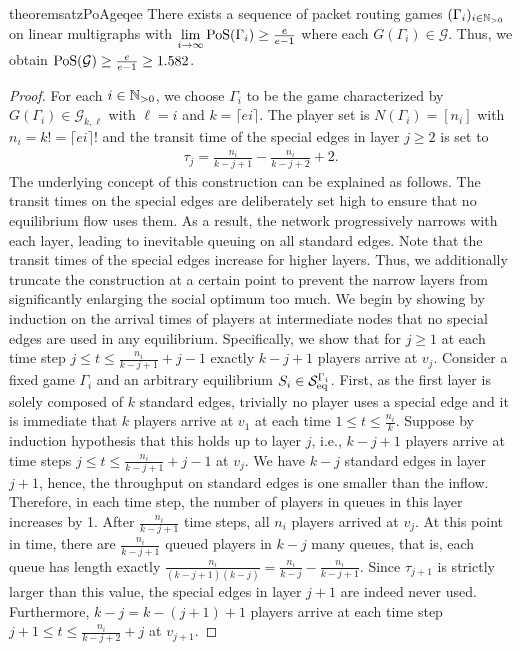 \begin{restatable}{theorem}{satzPoAgeqee}\label{satz_PoAgeqee1}
There exists a sequence of packet routing games $(\Gamma_i)_{i \in \mathbb{N}_{>0}}$ on linear multigraphs with
$\lim\limits_{i \rightarrow \infty} \operatorname*{PoS}(\Gamma_i) \geq \frac{e}{e-1}$ where each $G(\Gamma_i)\in \mathcal{G}$. Thus, we obtain $\operatorname*{PoS}(\mathcal{G})\geq \frac{e}{e-1}\geq 1.582$.
\end{restatable}
\begin{proof}
    For each $i\in \mathbb{N}_{>0}$, we choose $\Gamma_i$ to be the game characterized by $G(\Gamma_i)\in \mathcal{G}_{k,\ell}$ with $\ell = i$ and $k=\lceil ei\rceil$. The player set is $N(\Gamma_i)=[n_i]$ with $n_i= k!= \lceil ei\rceil!$ and the transit time of the special edges in layer $j\geq 2$ is set to
\begin{align*}
    \tau_j = \frac{n_i}{k-j+1} - \frac{n_i}{k-j+2} +2.
\end{align*}
The underlying concept of this construction can be explained as follows. The transit times on the special edges are deliberately set high to ensure that no equilibrium flow uses them. As a result, the network progressively narrows with each layer, leading to inevitable queuing on all standard edges. Note that the transit times of the special edges increase for higher layers. Thus, we additionally truncate the construction at a certain point to prevent the narrow layers from significantly enlarging the social optimum too much.
We begin by showing by induction on the arrival times of players at intermediate nodes that no special edges are used in any equilibrium. Specifically, we show that for $j\geq 1$ at each time step $j \leq t \leq \frac{n_i}{k-j+1}+j-1$ exactly $k-j+1$ players arrive at $v_j$. 
Consider a fixed game $\Gamma_i$ and an arbitrary equilibrium $S_i\in \mathcal{S}_{\operatorname{eq}}^{\Gamma_i}$.
First, as the first layer is solely composed of $k$ standard edges, trivially no player uses a special edge and it is immediate that $k$ players arrive at $v_1$ at each time $1\leq t \leq \frac{n_i}{k}$. 
Suppose by induction hypothesis that this holds up to layer $j$, i.e., $k-j+1$ players arrive at time steps $j \leq t \leq \frac{n_i}{k-j+1}+j-1$ at $v_j$. We have $k-j$ standard edges in layer $j+1$, hence, the throughput on standard edges is one smaller than the inflow. Therefore, in each time step, the number of players in queues in this layer increases by 1. After $\frac{n_i}{k-j+1}$ time steps, all $n_i$ players arrived at $v_j$. At this point in time, there are $\frac{n_i}{k-j+1}$ queued players in $k-j$ many queues, that is, each queue has length exactly $\frac{n_i}{(k-j+1)(k-j)}=\frac{n_i}{k-j}-\frac{n_i}{k-j+1}$. Since $\tau_{j+1}$ is strictly larger than this value, the special edges in layer $j+1$ are indeed never used. Furthermore, $k-j=k-(j+1)+1$ players arrive at each time step $j+1 \leq t \leq \frac{n_i}{k-j+2}+j$ at $v_{j+1}$.


\end{proof}

